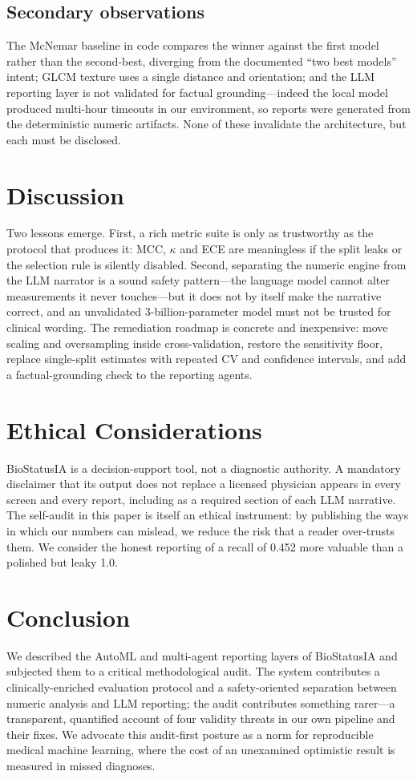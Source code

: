 \documentclass[10pt,twocolumn]{article}
\begin{document}
\subsection{Secondary observations}
The McNemar baseline in code compares the winner against the first model rather
than the second-best, diverging from the documented ``two best models'' intent;
GLCM texture uses a single distance and orientation; and the LLM reporting layer
is not validated for factual grounding---indeed the local model produced
multi-hour timeouts in our environment, so reports were generated from the
deterministic numeric artifacts. None of these invalidate the architecture, but
each must be disclosed.

\section{Discussion}
Two lessons emerge. First, a rich metric suite is only as trustworthy as the
protocol that produces it: MCC, $\kappa$ and ECE are meaningless if the split
leaks or the selection rule is silently disabled. Second, separating the
numeric engine from the LLM narrator is a sound safety pattern---the language
model cannot alter measurements it never touches---but it does not by itself
make the narrative correct, and an unvalidated 3-billion-parameter model must
not be trusted for clinical wording. The remediation roadmap is concrete and
inexpensive: move scaling and oversampling inside cross-validation, restore the
sensitivity floor, replace single-split estimates with repeated CV and
confidence intervals, and add a factual-grounding check to the reporting agents.

\section{Ethical Considerations}
BioStatusIA is a decision-support tool, not a diagnostic authority. A mandatory
disclaimer that its output does not replace a licensed physician appears in
every screen and every report, including as a required section of each LLM
narrative. The self-audit in this paper is itself an ethical instrument: by
publishing the ways in which our numbers can mislead, we reduce the risk that a
reader over-trusts them. We consider the honest reporting of a recall of 0.452
more valuable than a polished but leaky 1.0.

\section{Conclusion}
We described the AutoML and multi-agent reporting layers of BioStatusIA and
subjected them to a critical methodological audit. The system contributes a
clinically-enriched evaluation protocol and a safety-oriented separation between
numeric analysis and LLM reporting; the audit contributes something rarer---a
transparent, quantified account of four validity threats in our own pipeline and
their fixes. We advocate this audit-first posture as a norm for reproducible
medical machine learning, where the cost of an unexamined optimistic result is
measured in missed diagnoses.
\end{document}
